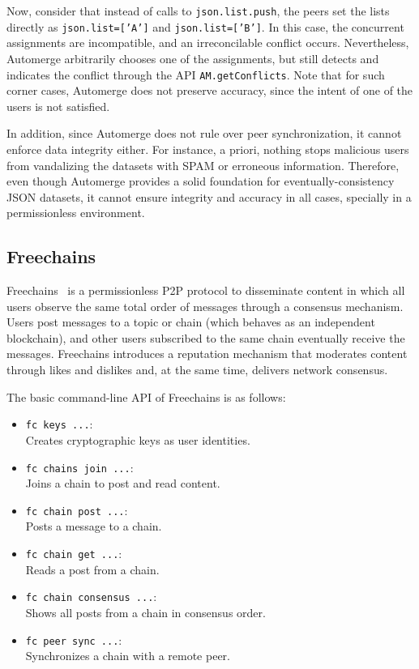 \documentclass[12pt]{article}
\newcommand{\code}[1]  {\texttt{\footnotesize{#1}}}
\begin{document}
Now, consider that instead of calls to \code{json.list.push}, the peers set the
lists directly as \code{json.list=['A']} and \code{json.list=['B']}.
In this case, the concurrent assignments are incompatible, and an
irreconcilable conflict occurs.
Nevertheless, Automerge arbitrarily chooses one of the assignments, but still
detects and indicates the conflict through the API \code{AM.getConflicts}.
Note that for such corner cases, Automerge does not preserve accuracy, since
the intent of one of the users is not satisfied.

In addition, since Automerge does not rule over peer synchronization, it cannot
enforce data integrity either.
For instance, a priori, nothing stops malicious users from vandalizing the
datasets with SPAM or erroneous information.
%
Therefore, even though Automerge provides a solid foundation for
eventually-consistency JSON datasets, it cannot ensure integrity and accuracy
in all cases, specially in a permissionless environment.

\subsection{Freechains}

Freechains~\cite{TODO} is a permissionless P2P protocol to disseminate content
in which all users observe the same total order of messages through a consensus
mechanism.
%
Users post messages to a topic or chain (which behaves as an independent
blockchain), and other users subscribed to the same chain eventually receive
the messages.
%
Freechains introduces a reputation mechanism that moderates content through
likes and dislikes and, at the same time, delivers network consensus.

The basic command-line API of Freechains is as follows:

\begin{itemize}
\item \code{fc keys ...}: \\
    Creates cryptographic keys as user identities.
\item \code{fc chains join ...}: \\
    Joins a chain to post and read content.
\item \code{fc chain post ...}: \\
    Posts a message to a chain.
\item \code{fc chain get ...}: \\
    Reads a post from a chain.
\item \code{fc chain consensus ...}: \\
    Shows all posts from a chain in consensus order.
\item \code{fc peer sync ...}: \\
    Synchronizes a chain with a remote peer.
\end{itemize}
\end{document}
